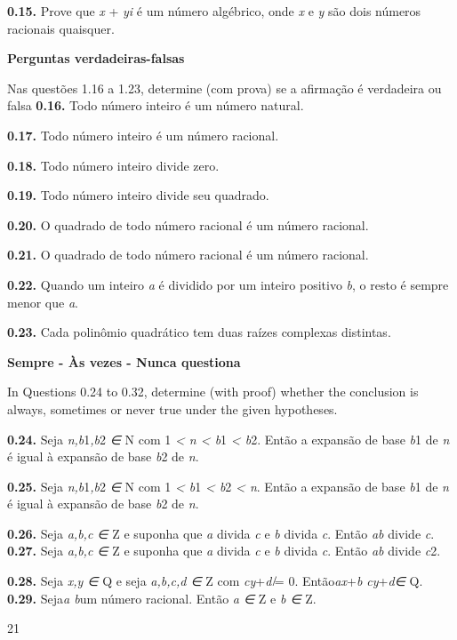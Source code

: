 \documentclass[
]{article}
\begin{document}
\textbf{0.15.} Prove que \emph{x} + \emph{yi} é um número algébrico,
onde \emph{x} e \emph{y} são dois números racionais quaisquer.

\textbf{Perguntas verdadeiras-falsas}

Nas questões 1.16 a 1.23, determine (com prova) se a afirmação é
verdadeira ou falsa \textbf{0.16.} Todo número inteiro é um número
natural.

\textbf{0.17.} Todo número inteiro é um número racional.

\textbf{0.18.} Todo número inteiro divide zero.

\textbf{0.19.} Todo número inteiro divide seu quadrado.

\textbf{0.20.} O quadrado de todo número racional é um número racional.

\textbf{0.21.} O quadrado de todo número racional é um número racional.

\textbf{0.22.} Quando um inteiro \emph{a} é dividido por um inteiro
positivo \emph{b}, o resto é sempre menor que \emph{a}.

\textbf{0.23.} Cada polinômio quadrático tem duas raízes complexas
distintas.

\textbf{Sempre - Às vezes - Nunca questiona}

In Questions 0.24 to 0.32, determine (with proof) whether the conclusion
is always, sometimes or never true under the given hypotheses.

\textbf{0.24.} Seja \emph{n,b}1\emph{,b}2 \emph{∈} N com 1
\emph{\textless{} n \textless{} b}1 \emph{\textless{} b}2. Então a
expansão de base \emph{b}1 de \emph{n} é igual à expansão de base
\emph{b}2 de \emph{n}.

\textbf{0.25.} Seja \emph{n,b}1\emph{,b}2 \emph{∈} N com 1
\emph{\textless{} b}1 \emph{\textless{} b}2 \emph{\textless{} n}. Então
a expansão de base \emph{b}1 de \emph{n} é igual à expansão de base
\emph{b}2 de \emph{n}.

\textbf{0.26.} Seja \emph{a,b,c ∈} Z e suponha que \emph{a} divida
\emph{c} e \emph{b} divida \emph{c}. Então \emph{ab} divide \emph{c}.
\textbf{0.27.} Seja \emph{a,b,c ∈} Z e suponha que \emph{a} divida
\emph{c} e \emph{b} divida \emph{c}. Então \emph{ab} divide \emph{c}2.

\textbf{0.28.} Seja \emph{x,y ∈} Q e seja \emph{a,b,c,d ∈} Z com
\emph{cy}+\emph{d ̸}= 0. Então\emph{ax}+\emph{b cy}+\emph{d∈} Q.
\textbf{0.29.} Seja\emph{a b}um número racional. Então \emph{a ∈} Z e
\emph{b ∈} Z.

21
\end{document}
